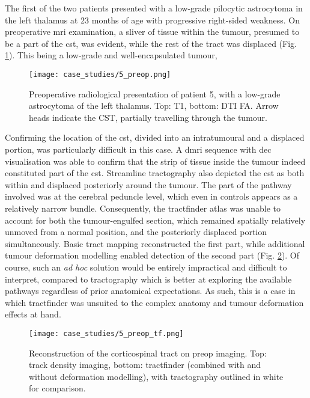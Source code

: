 The first of the two patients presented with a low-grade pilocytic astrocytoma in the left thalamus at 23 months of age with progressive right-sided weakness.
On preoperative \gls{mri} examination, a sliver of tissue within the tumour, presumed to be a part of the \gls{cst}, was evident, while the rest of the tract was displaced (Fig. \ref{fig:5p}).
This being a low-grade and well-encapsulated tumour,

\begin{figure}
  \centering
  \texttt{[image: case\_studies/5\_preop.png]}
  \caption{Preoperative radiological presentation of patient 5, with a low-grade astrocytoma of the left thalamus. Top: T1, bottom: DTI FA. Arrow heads indicate the CST, partially travelling through the tumour.}
  \label{fig:5p}
\end{figure}

Confirming the location of the \gls{cst}, divided into an intratumoural and a displaced portion, was particularly difficult in this case.
A \gls{dmri} sequence with \gls{dec} visualisation was able to confirm that the strip of tissue inside the tumour indeed constituted part of the \gls{cst}.
Streamline tractography also depicted the \gls{cst} as both within and displaced posteriorly around the tumour.
The part of the pathway involved was at the cerebral peduncle level, which even in controls appears as a relatively narrow bundle.
Consequently, the tractfinder atlas was unable to account for both the tumour-engulfed section, which remained spatially relatively unmoved from a normal position, and the posteriorly displaced portion simultaneously.
Basic tract mapping reconstructed the first part, while additional tumour deformation modelling enabled detection of the second part (Fig. \ref{fig:5p_cst}).
Of course, such an \textit{ad hoc} solution would be entirely impractical and difficult to interpret, compared to tractography which is better at exploring the available pathways regardless of prior anatomical expectations.
As such, this is a case in which tractfinder was unsuited to the complex anatomy and tumour deformation effects at hand.

\begin{figure}
  \centering
  \texttt{[image: case\_studies/5\_preop\_tf.png]}
  \caption{Reconstruction of the corticospinal tract on preop imaging. Top: track density imaging, bottom: tractfinder (combined with and without deformation modelling), with tractography outlined in white for comparison.}
  \label{fig:5p_cst}
\end{figure}

